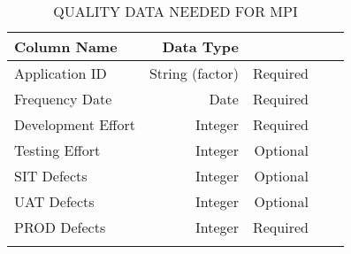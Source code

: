 \documentclass[SDSUThesis.tex]{subfiles}
\begin{document}
                \begin{longtable}{@{}l rr rr}
                    
                    \toprule%
                     \centering%
                     {\bfseries Column Name}
                     & {\bfseries Data Type}
                     &  \\
                    
                    \cmidrule[0.4pt](r{0.125em}){1-1}%
                    \cmidrule[0.4pt](lr{0.125em}){2-2}%
                    \cmidrule[0.4pt](l{0.125em}){3-3}%
                    \endhead
                    
                    Application ID & String (factor) & Required \\
                    \myrowcolour%
                    Frequency Date & Date & Required \\
                    Development Effort & Integer & Required \\
                    \myrowcolour%
                    Testing Effort & Integer & Optional \\ 
                    SIT Defects & Integer & Optional \\ 
                    \myrowcolour%
                    UAT Defects & Integer  & Optional \\ 
                    PROD Defects & Integer  & Required \\
                    
                    \bottomrule
                    
                    \caption{QUALITY DATA NEEDED FOR MPI}
                    \label{tab:qualitydata}
                \end{longtable}
                
\end{document}
